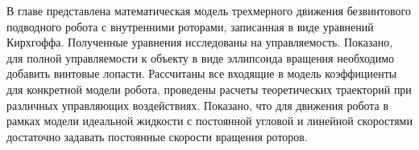 В главе представлена математическая модель трехмерного движения безвинтового подводного робота с внутренними роторами, записанная в виде уравнений Кирхгоффа. Полученные уравнения исследованы на управляемость. Показано, для полной управляемости к объекту в виде эллипсоида вращения необходимо добавить винтовые лопасти. Рассчитаны все входящие в модель коэффициенты для конкретной модели робота, проведены расчеты теоретических траекторий при различных управляющих воздействиях. Показано, что для движения робота в рамках модели идеальной жидкости с постоянной угловой и линейной скоростями достаточно задавать постоянные скорости вращения роторов.
%
%
%	
%	

